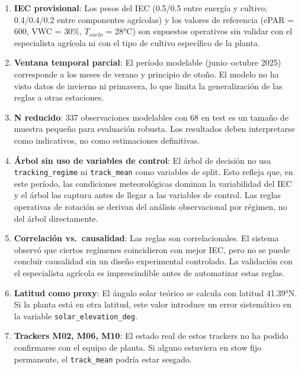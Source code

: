 \documentclass[12pt,a4paper]{article}
\begin{document}
\begin{enumerate}
    \item \textbf{IEC provisional}: Los pesos del IEC (0.5/0.5 entre energía y cultivo;
        0.4/0.4/0.2 entre componentes agrícolas) y los valores de referencia (ePAR = 600,
        VWC = 30\%, $T_{suelo}$ = 28°C) son supuestos operativos sin validar con
        el especialista agrícola ni con el tipo de cultivo específico de la planta.

    \item \textbf{Ventana temporal parcial}: El período modelable (junio--octubre 2025)
        corresponde a los meses de verano y principio de otoño. El modelo no ha visto
        datos de invierno ni primavera, lo que limita la generalización de las reglas
        a otras estaciones.

    \item \textbf{N reducido}: 337 observaciones modelables con 68 en test es un
        tamaño de muestra pequeño para evaluación robusta. Los resultados deben
        interpretarse como indicativos, no como estimaciones definitivas.

    \item \textbf{Árbol sin uso de variables de control}: El árbol de decisión no usa
        \texttt{tracking\_regime} ni \texttt{track\_mean} como variables de split. Esto
        refleja que, en este período, las condiciones meteorológicas dominan la
        variabilidad del IEC y el árbol las captura antes de llegar a las variables de
        control. Las reglas operativas de rotación se derivan del análisis observacional
        por régimen, no del árbol directamente.

    \item \textbf{Correlación vs.\ causalidad}: Las reglas son correlacionales. El
        sistema observó que ciertos regímenes coincidieron con mejor IEC, pero no se
        puede concluir causalidad sin un diseño experimental controlado. La validación
        con el especialista agrícola es imprescindible antes de automatizar estas reglas.

    \item \textbf{Latitud como proxy}: El ángulo solar teórico se calcula con latitud
        41.39°N. Si la planta está en otra latitud, este valor introduce un error
        sistemático en la variable \texttt{solar\_elevation\_deg}.

    \item \textbf{Trackers M02, M06, M10}: El estado real de estos trackers no ha podido
        confirmarse con el equipo de planta. Si alguno estuviera en stow fijo permanente,
        el \texttt{track\_mean} podría estar sesgado.
\end{enumerate}
\end{document}
